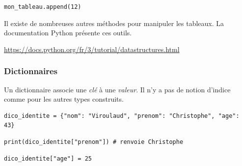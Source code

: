 \documentclass[a4paper,11pt]{article}
\begin{document}
\begin{Form}
\begin{code}[!h]
\begin{lstlisting}
mon_tableau.append(12)
\end{lstlisting}
\label{ajout}
\end{code}

Il existe de nombreuses autres méthodes pour manipuler les tableaux. La documentation Python présente ces outils.
\begin{center}
\url{https://docs.python.org/fr/3/tutorial/datastructures.html}
\end{center}
\subsubsection{Dictionnaires}
Un dictionnaire associe une \emph{clé} à une \emph{valeur}. Il n'y a pas de notion d'indice comme pour les autres types construits.
\begin{code}[!h]
\begin{lstlisting}
dico_identite = {"nom": "Viroulaud", "prenom": "Christophe", "age": 43}
\end{lstlisting}
\label{moncode}
\end{code}
\begin{code}[!h]
\begin{lstlisting}
print(dico_identite["prenom"]) # renvoie Christophe
\end{lstlisting}
\label{moncode}
\end{code}
\begin{code}[!h]
\begin{lstlisting}
dico_identite["age"] = 25
\end{lstlisting}
\label{moncode}
\end{code}

\end{Form}
\end{document}
